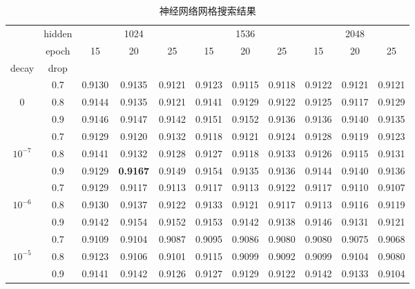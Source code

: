 \documentclass{article}
\begin{document}
\begin{table}[htbp]
    \label{tab:nn-grid-search}
    \begin{center}
        \caption{神经网络网格搜索结果}
        \begin{tabular}{cc|ccc|ccc|ccc}
            \toprule
            & hidden & \multicolumn{3}{c|}{1024} & \multicolumn{3}{c|}{1536} & \multicolumn{3}{c}{2048} \\
                         & epoch &   15 &   20 &   25 &   15 &   20 &   25 &   15 &   20 &   25 \\
                         \cline{1-2}
            decay & drop &        &        &        &        &        &        &        &        &        \\
            \hline
             & 0.7 & 0.9130 & 0.9135 & 0.9121 & 0.9123 & 0.9115 & 0.9118 & 0.9122 & 0.9121 & 0.9121 \\
             0 & 0.8 & 0.9144 & 0.9135 & 0.9121 & 0.9141 & 0.9129 & 0.9122 & 0.9125 & 0.9117 & 0.9129 \\
                         & 0.9 & 0.9146 & 0.9147 & 0.9142 & 0.9151 & 0.9152 & 0.9136 & 0.9136 & 0.9140 & 0.9135 \\
            \hline
             & 0.7 & 0.9129 & 0.9120 & 0.9132 & 0.9118 & 0.9121 & 0.9124 & 0.9128 & 0.9119 & 0.9123 \\
             $10^{-7}$  & 0.8 & 0.9141 & 0.9132 & 0.9128 & 0.9127 & 0.9118 & 0.9133 & 0.9126 & 0.9115 & 0.9131 \\
                         & 0.9 & 0.9129 & \textbf{0.9167} & 0.9149 & 0.9154 & 0.9135 & 0.9136 & 0.9144 & 0.9140 & 0.9136 \\
            \hline
             & 0.7 & 0.9129 & 0.9117 & 0.9113 & 0.9117 & 0.9113 & 0.9122 & 0.9117 & 0.9110 & 0.9107 \\
             $10^{-6}$  & 0.8 & 0.9130 & 0.9137 & 0.9122 & 0.9133 & 0.9121 & 0.9117 & 0.9113 & 0.9116 & 0.9119 \\
                         & 0.9 & 0.9142 & 0.9154 & 0.9152 & 0.9153 & 0.9142 & 0.9138 & 0.9146 & 0.9131 & 0.9121 \\
            \hline
             & 0.7 & 0.9109 & 0.9104 & 0.9087 & 0.9095 & 0.9086 & 0.9080 & 0.9080 & 0.9075 & 0.9068 \\
             $10^{-5}$ & 0.8 & 0.9123 & 0.9106 & 0.9101 & 0.9115 & 0.9099 & 0.9092 & 0.9099 & 0.9104 & 0.9080 \\
                         & 0.9 & 0.9141 & 0.9142 & 0.9126 & 0.9127 & 0.9129 & 0.9122 & 0.9142 & 0.9133 & 0.9104 \\
            \bottomrule
            \end{tabular}
    \end{center}
\end{table}
\end{document}
